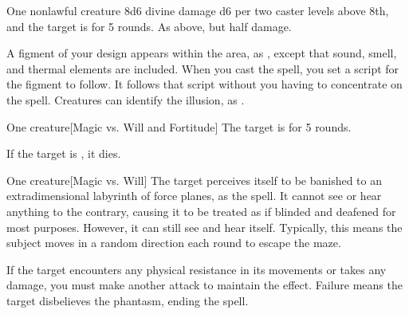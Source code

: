 \spellrng{\rngmed}
\begin{spelltarget}{One nonlawful creature}
    \spellsuccess 8d6 divine damage \add d6 per two caster levels above 8th, and the target is \bewildered for 5 rounds.
    \spellfailure As above, but half damage.
\end{spelltarget}

\spelldur{\durmed \dismissable}
\spellline
\spelleffect A figment of your design appears within the area, as , except that sound, smell, and thermal elements are included. When you cast the spell, you set a script for the figment to follow. It follows that script without you having to concentrate on the spell.
\spellnotes Creatures can identify the illusion, as .

\spellrng{\rngmed}
\begin{spelltarget}{One creature}[Magic vs. Will and Fortitude]
    \spellsuccess[Will] The target is \shaken for 5 rounds.

     If the target is \bloodied, it dies.
\end{spelltarget}

\spellrng{\rngmed}
\spelldur{\durmed}
\begin{spelltarget}{One creature}[Magic vs. Will]
    \spellsuccess The target perceives itself to be banished to an extradimensional labyrinth of force planes, as the  spell. It cannot see or hear anything to the contrary, causing it to be treated as if blinded and deafened for most purposes. However, it can still see and hear itself. Typically, this means the subject moves in a random direction each round to escape the maze.

    If the target encounters any physical resistance in its movements or takes any damage, you must make another attack to maintain the effect. Failure means the target disbelieves the phantasm, ending the spell.
\end{spelltarget}

